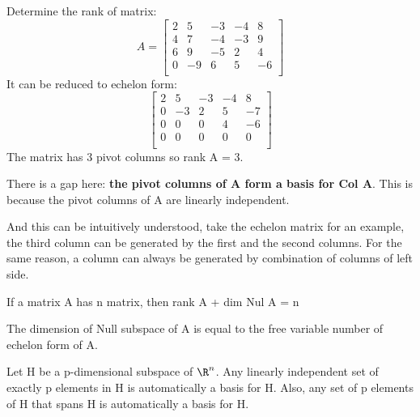 \begin{eg}
    Determine the rank of matrix:
    \[
        A = \begin{bmatrix}
            2 & 5 & -3 & -4 &  8 \\
            4 & 7 & -4 & -3 &  9 \\
            6 & 9 & -5 & 2 &  4 \\
            0 & -9 & 6 & 5 &  -6 \\
        \end{bmatrix}
    \]
    It can be reduced to echelon form:
    \[
        \begin{bmatrix}
            2 & 5 & -3 & -4 &  8 \\
            0 & -3 & 2 & 5 &  -7 \\
            0 & 0 & 0 & 4 &  -6 \\
            0 & 0 & 0 & 0 &  0 \\
        \end{bmatrix}
    \]
    The matrix has 3 pivot columns so rank A = 3.

    There is a gap here: \textbf{the pivot columns of A form a basis for Col A}.  This is because the pivot columns of A are linearly independent. 

    And this can be intuitively understood, take the echelon matrix for an example, the third column can be generated by the first and the second columns. For the same reason, a column can always be generated by combination of columns of left side. 
\end{eg}

\begin{theorem}
    If a matrix A has n matrix, then rank A + dim Nul A = n
\end{theorem}

\begin{remark}
    The dimension of Null subspace of A is equal to the free variable number of echelon form of A.
\end{remark}

\break
\begin{theorem}
    Let H be a p-dimensional subspace of \(\R^n\). Any linearly independent set of exactly p elements in H is automatically a basis for H. Also, any set of p elements of H that spans H is automatically a basis for H. 
\end{theorem}